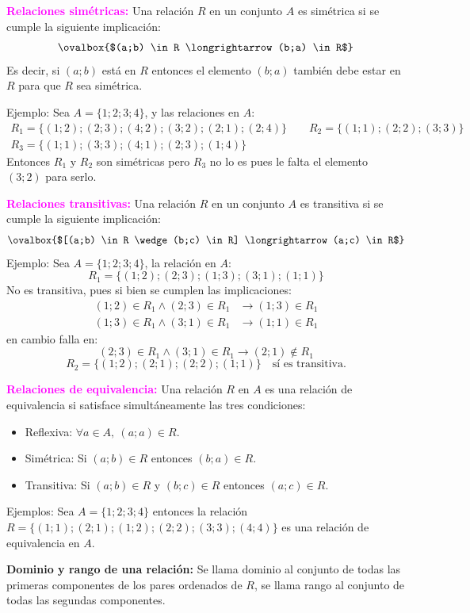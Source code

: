 \documentclass[11pt,a4paper]{article}
\begin{document}
\textcolor{magenta}{\textbf{Relaciones simétricas:}} Una relación $R$ en un conjunto $A$ es
simétrica si se cumple la siguiente implicación:
\[\ovalbox{$(a;b) \in R \longrightarrow (b;a) \in R$}\]
Es decir, si $(a;b)$ está en $R$ entonces el elemento $(b;a)$ también debe estar en $R$ para
que $R$ sea simétrica.

Ejemplo: Sea $A = \{1; 2; 3; 4\}$, y las relaciones en $A$:
\begin{gather*}
R_1 = \{(1;2); (2;3); (4;2); (3;2); (2;1); (2;4)\} \qquad R_2 = \{(1;1); (2;2); (3;3)\}\\
R_3 = \{(1;1); (3;3); (4;1); (2;3); (1;4)\}
\end{gather*}
Entonces $R_1$ y $R_2$ son simétricas pero $R_3$ no lo es pues le falta el elemento $(3;2)$
para serlo.

\textcolor{magenta}{\textbf{Relaciones transitivas:}} Una relación $R$ en un conjunto $A$ es
transitiva si se cumple la siguiente implicación:
\[\ovalbox{$[(a;b) \in R \wedge (b;c) \in R] \longrightarrow (a;c) \in R$}\]
Ejemplo: Sea $A = \{1; 2; 3; 4\}$, la relación en $A$:
\[R_1 = \{(1;2); (2;3); (1;3); (3;1); (1;1)\}\]
No es transitiva, pues si bien se cumplen las implicaciones:
\begin{align*}
(1;2) \in R_1 \wedge (2;3) \in R_1 &\longrightarrow (1;3) \in R_1\\
(1;3) \in R_1 \wedge (3;1) \in R_1 &\longrightarrow (1;1) \in R_1
\end{align*}
en cambio falla en:
\[(2;3) \in R_1 \wedge (3;1) \in R_1 \longrightarrow (2;1) \notin R_1\]
\[R_2 = \{(1;2); (2;1); (2;2); (1;1)\} \quad \text{sí es transitiva.}\]

\textcolor{magenta}{\textbf{Relaciones de equivalencia:}} Una relación $R$ en $A$ es una
relación de equivalencia si satisface simultáneamente las tres condiciones:
\begin{itemize}[label=\textcolor{rojo}{\checkmark}]
  \item \textcolor{rojo}{Reflexiva:} $\forall a \in A,\ (a;a) \in R$.
  \item \textcolor{rojo}{Simétrica:} Si $(a;b) \in R$ entonces $(b;a) \in R$.
  \item \textcolor{rojo}{Transitiva:} Si $(a;b) \in R$ y $(b;c) \in R$ entonces $(a;c) \in R$.
\end{itemize}
Ejemplos: Sea $A = \{1; 2; 3; 4\}$ entonces la relación
$R = \{(1;1); (2;1); (1;2); (2;2); (3;3); (4;4)\}$ es una relación de equivalencia en $A$.

\textbf{Dominio y rango de una relación:} Se llama dominio al conjunto de todas las primeras
componentes de los pares ordenados de $R$, se llama rango al conjunto de todas las segundas
componentes.
\end{document}
